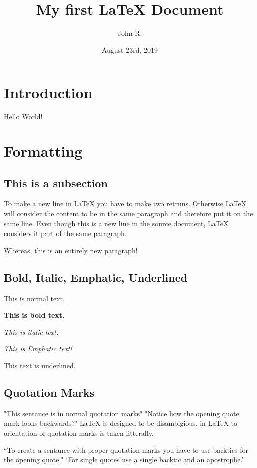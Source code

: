 \documentclass{article}
\author{John R.}
\title{My first {\LaTeX} Document}
\date{August 23rd, 2019}
\begin{document}
\maketitle

\section{Introduction}

Hello World!

\section{Formatting}
\subsection{This is a subsection}

To make a new line in {\LaTeX} you have to make two retruns.
Otherwise LaTeX will consider the content to be in the same paragraph and therefore put it on the same line.
Even though this is a new line in the source document, LaTeX considers it part of the same paragraph.

Whereas, this is an entirely new paragraph!

\subsection{Bold, Italic, Emphatic, Underlined}
This is normal text.

\textbf{This is bold text.}

\textit{This is italic text.}

\emph{This is Emphatic text!}

\underline{This text is underlined.}

\subsection{Quotation Marks}

"This sentance is in normal quotation marks" 
"Notice how the opening quote mark looks backwards?"
{\LaTeX} is designed to be disambigious.
in LaTeX to orientation of quotation marks is taken litterally.

``To create a sentance with proper quotation marks you have to use backtics for the opening quote."
`For single quotes use a single backtic and an apostrophe.'
\end{document}
